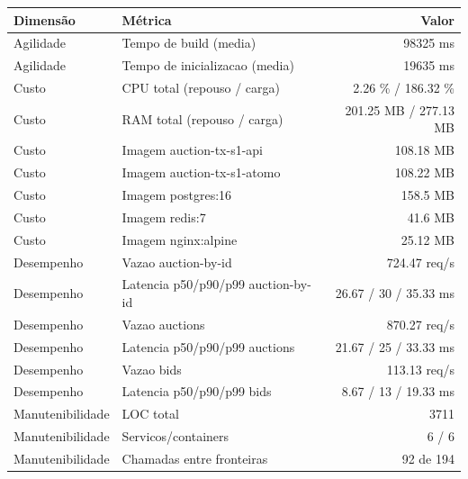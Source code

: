 \begin{quadro}[htb]
  \centering
  \caption{Métricas (auction, transacoes, snapshot-1).}
  \label{qua:metricas-auction-transacoes-snapshot-1}
  \renewcommand{\arraystretch}{1.15}
  \begin{tabular}{|l|l|r|}
    \hline
    \textbf{Dimensão} & \textbf{Métrica} & \textbf{Valor} \\
    \hline
    Agilidade & Tempo de build (media) & 98325 ms \\ \hline
    Agilidade & Tempo de inicializacao (media) & 19635 ms \\ \hline
    Custo & CPU total (repouso / carga) & 2.26 \% / 186.32 \% \\ \hline
    Custo & RAM total (repouso / carga) & 201.25 MB / 277.13 MB \\ \hline
    Custo & Imagem auction-tx-s1-api & 108.18 MB \\ \hline
    Custo & Imagem auction-tx-s1-atomo & 108.22 MB \\ \hline
    Custo & Imagem postgres:16 & 158.5 MB \\ \hline
    Custo & Imagem redis:7 & 41.6 MB \\ \hline
    Custo & Imagem nginx:alpine & 25.12 MB \\ \hline
    Desempenho & Vazao auction-by-id & 724.47 req/s \\ \hline
    Desempenho & Latencia p50/p90/p99 auction-by-id & 26.67 / 30 / 35.33 ms \\ \hline
    Desempenho & Vazao auctions & 870.27 req/s \\ \hline
    Desempenho & Latencia p50/p90/p99 auctions & 21.67 / 25 / 33.33 ms \\ \hline
    Desempenho & Vazao bids & 113.13 req/s \\ \hline
    Desempenho & Latencia p50/p90/p99 bids & 8.67 / 13 / 19.33 ms \\ \hline
    Manutenibilidade & LOC total & 3711 \\ \hline
    Manutenibilidade & Servicos/containers & 6 / 6 \\ \hline
    Manutenibilidade & Chamadas entre fronteiras & 92 de 194 \\ \hline
  \end{tabular}
\end{quadro}
